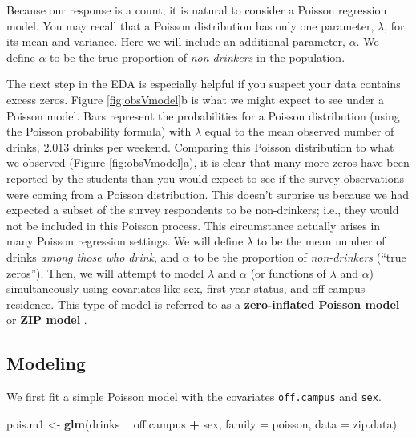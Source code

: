 \documentclass[
]{krantz}
\newenvironment{Shaded}{\begin{snugshade}}{\end{snugshade}}
\newcommand{\DataTypeTok}[1]{\textcolor[rgb]{0.27,0.27,0.27}{#1}}
\newcommand{\KeywordTok}[1]{\textcolor[rgb]{0.27,0.27,0.27}{\textbf{#1}}}
\newcommand{\NormalTok}[1]{#1}
\newcommand{\OperatorTok}[1]{\textcolor[rgb]{0.43,0.43,0.43}{\textbf{#1}}}
\newcommand{\StringTok}[1]{\textcolor[rgb]{0.5,0.5,0.5}{#1}}
\begin{document}
Because our response is a count, it is natural to consider a Poisson regression model. You may recall that a Poisson distribution has only one parameter, \(\lambda\), for its mean and variance. Here we will include an additional parameter, \(\alpha\). We define \(\alpha\) to be the true proportion of \emph{non-drinkers} in the population.

The next step in the EDA is especially helpful if you suspect your data contains excess zeros. Figure \ref{fig:obsVmodel}b is what we might expect to see under a Poisson model. Bars represent the probabilities for a Poisson distribution (using the Poisson probability formula) with \(\lambda\) equal to the mean observed number of drinks, 2.013 drinks per weekend. Comparing this Poisson distribution to what we observed (Figure \ref{fig:obsVmodel}a), it is clear that many more zeros have been reported by the students than you would expect to see if the survey observations were coming from a Poisson distribution. This doesn't surprise us because we had expected a subset of the survey respondents to be non-drinkers; i.e., they would not be included in this Poisson process. This circumstance actually arises in many Poisson regression settings. We will define \(\lambda\) to be the mean number of drinks \emph{among those who drink}, and \(\alpha\) to be the proportion of \emph{non-drinkers} (``true zeros''). Then, we will attempt to model \(\lambda\) and \(\alpha\) (or functions of \(\lambda\) and \(\alpha\)) simultaneously using covariates like sex, first-year status, and off-campus residence. This type of model is referred to as a \textbf{zero-inflated Poisson model} or \textbf{ZIP model} .

\hypertarget{modeling}{%
\subsection{Modeling}\label{modeling}}

We first fit a simple Poisson model with the covariates \texttt{off.campus} and \texttt{sex}.

\begin{Shaded}
\begin{Highlighting}[]
\NormalTok{pois.m1 <-}\StringTok{ }\KeywordTok{glm}\NormalTok{(drinks }\OperatorTok{~}\StringTok{ }\NormalTok{off.campus }\OperatorTok{+}\StringTok{ }\NormalTok{sex, }\DataTypeTok{family =}\NormalTok{ poisson,}
               \DataTypeTok{data =}\NormalTok{ zip.data)}
\end{Highlighting}
\end{Shaded}
\end{document}
